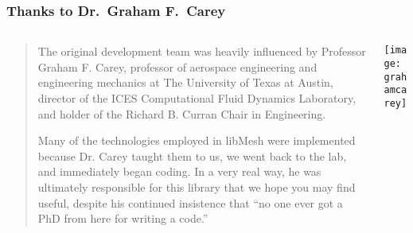 %

\frame
{
  \frametitle{Thanks to Dr.\ Graham F.\ Carey}

  \begin{columns}
    \begin{column}{.55\textwidth}
      \scriptsize
      \begin{quote}
        The original development team was heavily influenced by Professor Graham F. Carey, professor of aerospace engineering and engineering mechanics at The University of Texas at Austin, director of the ICES Computational Fluid Dynamics Laboratory, and holder of the Richard B. Curran Chair in Engineering.

        Many of the technologies employed in libMesh were implemented because Dr. Carey taught them to us, we went back to the lab, and immediately began coding. In a very real way, he was ultimately responsible for this library that we hope you may find useful, despite his continued insistence that ``no one ever got a PhD from here for writing a code.''
      \end{quote}
\normalsize
    \end{column}
    \begin{column}{.45\textwidth}
      \texttt{[image: grahamcarey]}
    \end{column}
  \end{columns}
}



